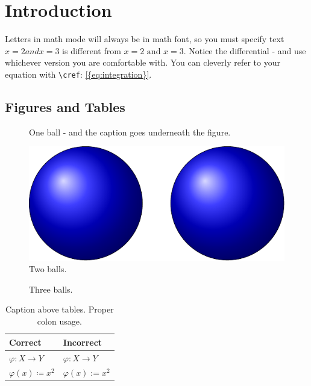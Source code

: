 \chapter{Introduction}
\label{c:intro}


Letters in math mode will always be in math font, so you must specify text $x=2 and x=3$ is different from $x=2 \text{ and } x=3$. Notice the differential - and use whichever version you are comfortable with.
You can cleverly refer to your equation with \texttt{\textbackslash cref}: \cref{{eq:integration}}.

\section{Figures and Tables}

\begin{figure}[htbp]
    \centering
    
    \caption[One ball]{One ball - and the caption goes underneath the figure.}
\end{figure}

\begin{figure}[thbp]
    \centering
    \includegraphics{figures/balls.pdf}
    \caption[Two balls]{Two balls.}
\end{figure}

\begin{figure}[hbp]
    \centering
    \caption[Three balls]{Three balls.}
\end{figure}


\begin{table}[htbp]
    \centering
       \caption[Colons (to appear in TOC)]{Caption above tables. Proper colon usage.}
    \begin{tabular}{@{}ll@{}}
        \toprule
        \textsf{Correct}               & \textsf{Incorrect}      \\
        \midrule
        \( \varphi \colon X \to Y \)   & \( \varphi : X \to Y \) \\[0.5ex]
        \( \varphi(x) \coloneqq x^2 \) & \( \varphi(x) := x^2 \) \\
        \bottomrule
    \end{tabular}
\end{table}

